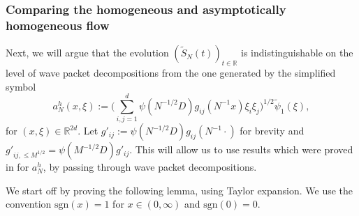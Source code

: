 \documentclass{amsart}
\numberwithin{equation}{section}
\theoremstyle{definition}
\newcommand{\R}{\mathbb{R}}
\begin{document}
\subsubsection{Comparing the homogeneous and asymptotically homogeneous flow}
\label{subsection:Comparison}
Next, we will argue that the evolution $(\tilde{S}_{N}(t))_{t\in\R}$ is indistinguishable on the level of wave packet decompositions from the one generated by the simplified symbol 
\begin{equation}\label{eq:aNh}
a_N^{h}(x,\xi) := \Big(\sum_{i,j=1}^{d}\psi(N^{-1/2}D)g_{ij}(N^{-1} x) \xi_i \xi_j\Big)^{1/2} \tilde{\psi}_{1}(\xi),
\end{equation}
for $(x,\xi)\in\R^{2d}$. Let $g'_{ij}:= \psi(N^{-1/2}D) g_{ij}(N^{-1} \cdot)$ for brevity and $g'_{ij, \leq M^{1/2}} = \psi(M^{-1/2} D) g'_{ij}$. This will allow us to use results %
which were proved in \cite{SchippaTataru2025} for $a_N^h$, by passing through wave packet decompositions. 

We start off by proving the following lemma, using Taylor expansion. We use the convention $\text{sgn}(x) = 1$ for $x\in(0,\infty)$ and $\text{sgn}(0) = 0$.
\end{document}
